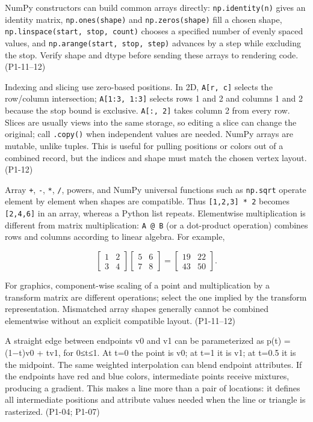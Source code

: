 NumPy constructors can build common arrays directly: \texttt{np.identity(n)} gives an identity matrix, \texttt{np.ones(shape)} and \texttt{np.zeros(shape)} fill a chosen shape, \texttt{np.linspace(start,\ stop,\ count)} chooses a specified number of evenly spaced values, and \texttt{np.arange(start,\ stop,\ step)} advances by a step while excluding the stop. Verify shape and dtype before sending these arrays to rendering code. (P1-11--12)

Indexing and slicing use zero-based positions. In 2D, \texttt{A{[}r,\ c{]}} selects the row/column intersection; \texttt{A{[}1:3,\ 1:3{]}} selects rows 1 and 2 and columns 1 and 2 because the stop bound is exclusive. \texttt{A{[}:,\ 2{]}} takes column 2 from every row. Slices are usually views into the same storage, so editing a slice can change the original; call \texttt{.copy()} when independent values are needed. NumPy arrays are mutable, unlike tuples. This is useful for pulling positions or colors out of a combined record, but the indices and shape must match the chosen vertex layout. (P1-12)

Array \texttt{+}, \texttt{-}, \texttt{*}, \texttt{/}, powers, and NumPy universal functions such as \texttt{np.sqrt} operate element by element when shapes are compatible. Thus \texttt{{[}1,2,3{]}\ *\ 2} becomes \texttt{{[}2,4,6{]}} in an array, whereas a Python list repeats. Elementwise multiplication is different from matrix multiplication: \texttt{A\ @\ B} (or a dot-product operation) combines rows and columns according to linear algebra. For example,

\[
\begin{bmatrix}1&2\\3&4\end{bmatrix}
\begin{bmatrix}5&6\\7&8\end{bmatrix}
=
\begin{bmatrix}19&22\\43&50\end{bmatrix}.
\]

For graphics, component-wise scaling of a point and multiplication by a transform matrix are different operations; select the one implied by the transform representation. Mismatched array shapes generally cannot be combined elementwise without an explicit compatible layout. (P1-11--12)

A straight edge between endpoints v0 and v1 can be parameterized as p(t) = (1−t)v0 + tv1, for 0≤t≤1. At t=0 the point is v0; at t=1 it is v1; at t=0.5 it is the midpoint. The same weighted interpolation can blend endpoint attributes. If the endpoints have red and blue colors, intermediate points receive mixtures, producing a gradient. This makes a line more than a pair of locations: it defines all intermediate positions and attribute values needed when the line or triangle is rasterized. (P1-04; P1-07)

